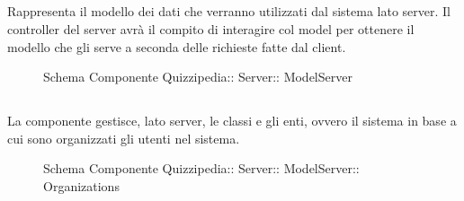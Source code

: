 \subsection{}
Rappresenta il modello dei dati che verranno utilizzati dal sistema lato server. 
Il controller del server avrà il compito di interagire col model per ottenere il modello che gli serve a seconda delle richieste fatte dal client.
\begin{figure}[H]
\centering
\noindent{}
\caption[Schema Componente ModelServer]{Schema Componente Quizzipedia:: Server:: ModelServer}
\end{figure}
\subsection{}
La componente gestisce, lato server, le classi e gli enti, ovvero il sistema in base a cui sono organizzati gli utenti nel sistema.
\begin{figure}[H]
\centering
\noindent{}
\caption[Schema Componente Organizations]{Schema Componente Quizzipedia:: Server:: ModelServer:: Organizations}
\end{figure}
